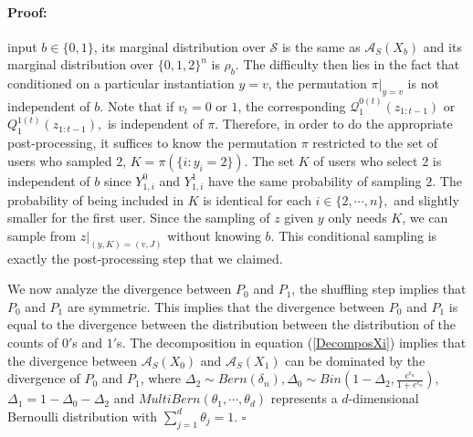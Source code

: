 \documentclass[letterpaper]{article} %
\newenvironment{proof}{\paragraph{Proof:}}{\hfill$\square$}
\begin{document}
\begin{proof}
input $b \in \{0,1\}$, its marginal distribution over $\mathcal{S}$ is the same as $\mathcal{A}_S(X_b)$ and its marginal distribution over $\{0,1,2\}^n$ is $\rho_b$.
The difficulty then lies in the fact that conditioned on a particular instantiation $y=v$, the permutation $\pi|_{y=v}$ is not independent of $b$.
Note that if $v_t=0$ or $1$, the corresponding $\mathcal{Q}^{0(t)}_1(z_{1:t-1})$ or $Q_1^{1(t)}(z_{1:t-1}),$ is independent of $\pi$. Therefore, in order to do the appropriate
post-processing, it suffices to know the permutation $\pi$ restricted to the set of users who sampled $2$, $K=\pi(\{i:y_i=2\})$. The set $K$ of users who select $2$ is independent of $b$ since $Y_{1,i}^0$ and $Y_{1,i}^1$ have the same probability of sampling $2$. The probability of being included in $K$ is identical for each $i \in \{2,\cdots,n\},$ and slightly smaller for the first user. Since the sampling of $z$ given $y$ only needs $K$, we can sample from $z|_{(y,K)=(v,J)}$ without knowing $b$. This conditional sampling is exactly the post-processing step that we claimed.

We now analyze the divergence between $P_0$ and $P_1$, the shuffling step implies that $P_0$ and $P_1$ are symmetric. This implies that the divergence between $P_0$ and $P_1$ is equal to the divergence between the distribution between the distribution of the counts of $0'$s and $1'$s.
The decomposition in equation (\ref{DecomposXi}) implies that the divergence between $\mathcal{A}_S(X_0)$ and $\mathcal{A}_S(X_1)$ can be dominated by the divergence of $P_0$ and $P_1$, where
$\Delta_2 \sim Bern(\delta_{n}), \Delta_0 \sim Bin(1-\Delta_2,\frac{e^{\epsilon_n}}{1+e^{\epsilon_n}})$,
$\Delta_1 = 1 - \Delta_0 - \Delta_2$
 and
 $MultiBern(\theta_1,\cdots, \theta_d)$ represents a $d$-dimensional Bernoulli distribution with $ \sum_{j=1}^d\theta_j = 1$.
\end{proof}
\end{document}

